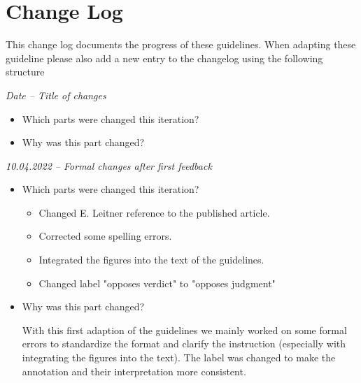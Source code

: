 \documentclass{article}
\begin{document}
\section{Change Log}
This change log documents the progress of these guidelines. When adapting these guideline please also add a new entry to the changelog using the following structure
\begin{mdframed}[frametitle={Template}]
\emph{Date – Title of changes}
\begin{itemize}
	\item Which parts were changed this iteration?
    \item Why was this part changed?
\end{itemize}
\end{mdframed}
\begin{mdframed}[frametitle={Change log}]
\emph{10.04.2022 – Formal changes after first feedback}
\begin{itemize}
	\item Which parts were changed this iteration? 
	\begin{itemize}
	    \item Changed E. Leitner reference to the published article.
	    \item Corrected some spelling errors.
	    \item Integrated the figures into the text of the guidelines.
	    \item Changed label "opposes verdict" to "opposes judgment"
	\end{itemize} 
    \item Why was this part changed?
    
    With this first adaption of the guidelines we mainly worked on some formal errors to standardize the format and clarify the instruction (especially with integrating the figures into the text). The label was changed to make the annotation and their interpretation more consistent.

\end{itemize}
\end{mdframed}
\end{document}
